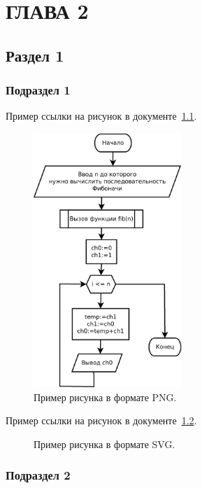 \chapter{\label{ch:ch02}ГЛАВА 2}

\section{\label{sec:ch02/sec01}Раздел 1}

\subsection{\label{subsec:ch02/sec01/sub01}Подраздел 1}

Пример ссылки на рисунок в документе~\ref{fig:example03}.
\begin{figure}[h]
    \centering
    \includegraphics[width=0.5\textwidth]{./images/fibonacci.png}
    \caption{\centering\label{fig:example03}Пример рисунка в формате PNG.}
\end{figure}

Пример ссылки на рисунок в документе~\ref{fig:example04}.
\begin{figure}[h]
    \centering
    
    \caption{\centering\label{fig:example04}Пример рисунка в формате SVG.}
\end{figure}

\subsection{\label{subsec:ch02/sec01/sub02}Подраздел 2}

